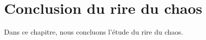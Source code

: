 \chapter{Conclusion du rire du chaos}
Dans ce chapitre, nous concluons l'étude du rire du chaos.

\lipsum[6-9]
